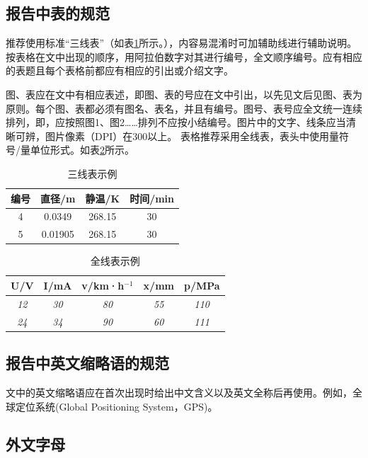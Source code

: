 \documentclass{thuemp}
\begin{document}
\subsection{报告中表的规范}
推荐使用标准“三线表”（如表\ref{tab:eg1}所示。），内容易混淆时可加辅助线进行辅助说明。按表格在文中出现的顺序，用阿拉伯数字对其进行编号，全文顺序编号。应有相应的表题且每个表格前都应有相应的引出或介绍文字。

图、表应在文中有相应表述，即图、表的号应在文中引出，以先见文后见图、表为原则。每个图、表都必须有图名、表名，并且有编号。图号、表号应全文统一连续排列，即，应按照图1、图2……排列不应按小结编号。图片中的文字、线条应当清晰可辨，图片像素（DPI）在300以上。
表格推荐采用全线表，表头中使用量符号/量单位形式。如表\ref{tab:eg2}所示。

\begin{table}[h]
\centering
\captionnamefont{\wuhao\bf\heiti}
\captiontitlefont{\wuhao\bf\heiti}
\caption{三线表示例} \label{tab:eg1}
\liuhao
\begin{tabular}{cccc}
\toprule
{编号} &  {直径}/\si{\metre} & {静温}/\si{\kelvin} & {时间}/min\\
\midrule 
4 & 0.0349 & 268.15 & 30\\
5 & 0.01905 & 268.15 & 30\\
\bottomrule
\end{tabular}
\end{table}

\begin{table}[h]
\centering
\captionnamefont{\wuhao\bf\heiti}
\captiontitlefont{\wuhao\bf\heiti}
\caption{全线表示例} \label{tab:eg2}
\liuhao
\begin{tabular}{|c|c|c|c|c|}
\hline
U/V & I/mA & v/km·h$^{-1}$ & x/mm & p/MPa \\ \hline
\textit{12} & \textit{30} & \textit{80} & \textit{55} & \textit{110} \\ \hline
\textit{24} & \textit{34} & \textit{90} & \textit{60} & \textit{111} \\ \hline
\end{tabular}
\end{table}

\subsection{报告中英文缩略语的规范}
文中的英文缩略语应在首次出现时给出中文含义以及英文全称后再使用。例如，全球定位系统(Global Positioning System，GPS)。


\subsection{外文字母}
\end{document}
